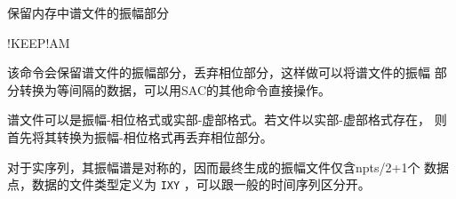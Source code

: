 \label{cmd:keepam}

保留内存中谱文件的振幅部分

\begin{SACSTX}
!KEEP!AM
\end{SACSTX}

该命令会保留谱文件的振幅部分，丢弃相位部分，这样做可以将谱文件的振幅
部分转换为等间隔的数据，可以用SAC的其他命令直接操作。

谱文件可以是振幅-相位格式或实部-虚部格式。若文件以实部-虚部格式存在，
则首先将其转换为振幅-相位格式再丢弃相位部分。

对于实序列，其振幅谱是对称的，因而最终生成的振幅文件仅含npts/2+1个
数据点，数据的文件类型定义为 \texttt{IXY} ，可以跟一般的时间序列区分开。
